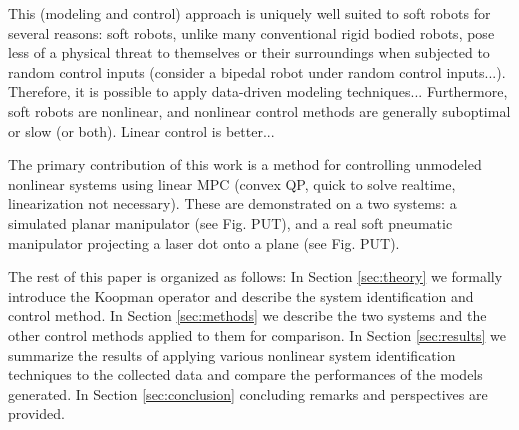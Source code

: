 This (modeling and control) approach is uniquely well suited to soft robots for several reasons: soft robots, unlike many conventional rigid bodied robots, pose less of a physical threat to themselves or their surroundings when subjected to random control inputs (consider a bipedal robot under random control inputs...). Therefore, it is possible to apply data-driven modeling techniques... 
Furthermore, soft robots are nonlinear, and nonlinear control methods are generally suboptimal or slow (or both). Linear control is better...

The primary contribution of this work is a method for controlling unmodeled nonlinear systems using linear MPC (convex QP, quick to solve realtime, linearization not necessary). 
These are demonstrated on a two systems: a simulated planar manipulator (see Fig. PUT), and a real soft pneumatic manipulator projecting a laser dot onto a plane (see Fig. PUT). 

The rest of this paper is organized as follows:
In Section \ref{sec:theory} we formally introduce the Koopman operator and describe the system identification and control method. 
In Section \ref{sec:methods} we describe the two systems and the other control methods applied to them for comparison.
In Section \ref{sec:results} we summarize the results of applying various nonlinear system identification techniques to the collected data and compare the performances of the models generated. 
In Section \ref{sec:conclusion} concluding remarks and perspectives are provided.